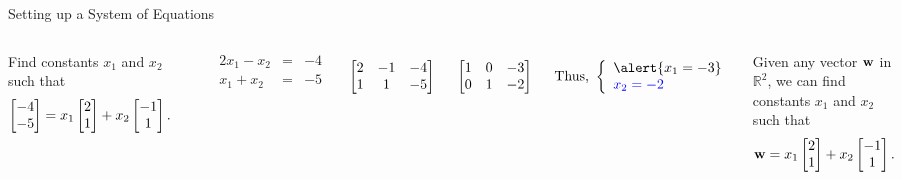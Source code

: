 \documentclass[xcolor=dvipsnames,aspectratio=169,t]{beamer}
\begin{document}
\begin{frame}{Setting up a System of Equations}

  \begin{columns}[T]
    \column{0.5\tw}

    {\small
  \begin{example}

    Find constants $x_1$ and $x_2$ such that
    \[ \begin{bmatrix} -4 \\ -5 \end{bmatrix} = x_1 \begin{bmatrix} 2 \\ 1 \end{bmatrix} + x_2 \begin{bmatrix} -1 \\ 1 \end{bmatrix} .\]
\end{example} }

\includegraphics[width=0.95\tw]{images/fig-span3.png}
    
  \column{0.5\tw}
{\small 
  \[  \begin{array}{rcl}
      2x_1 -x_2 &=& -4 \\
      x_1+x_2 &=& - 5 \end{array} \]

  \[ \begin{bmatrix} 2 & - 1 & -4 \\
  1 & 1 & -5
  \end{bmatrix} \]

  \[ \begin{bmatrix} 1 & 0 & -3 \\
  0 & 1 & -2 \end{bmatrix} \]

 \[ \mbox{Thus, }  \left\{ \begin{array}{l}
  \alert{x_1 = -3}\\
  \colorb{x_2 = -2}  \end{array} \right. \]

 \vfill

 \alert{Given any vector $\mathbf{w}$ in $\mathbb{R}^2$, we can find constants $x_1$ and $x_2$ such that
   \[ \mathbf{w} = x_1 \begin{bmatrix} 2 \\ 1 \end{bmatrix} + x_2 \begin{bmatrix} -1 \\ 1 \end{bmatrix} . \] } }
 
  \end{columns}

  \vspace{2in}


  \end{frame}
\end{document}
